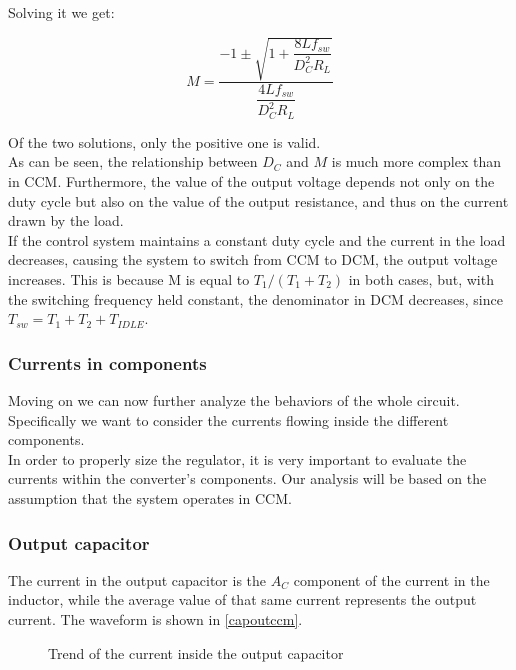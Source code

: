 \documentclass[../main.tex]{subfiles}
\begin{document}
Solving it we get:

\begin{equation}
	M = \dfrac{-1 \pm \sqrt{1 + \dfrac{8Lf_{sw}}{D^2_CR_L}} }{\dfrac{4Lf_{sw}}{D^2_CR_L}}
\end{equation}

Of the two solutions, only the positive one is valid.\\
As can be seen, the relationship between $D_C$ and $M$ is much more complex than in CCM. Furthermore, the value of the output voltage depends not only on the duty cycle but also on the value of the output resistance, and thus on the current drawn by the load. \\
If the control system maintains a constant duty cycle and the current in the load decreases, causing the system to switch from CCM to DCM, the output
voltage increases. This is because M is equal to $T_1 /(T_1 + T_2)$ in both cases, but, with the switching frequency held constant, the denominator in DCM decreases, since $T_{sw} = T_1 + T_2 + T_{IDLE}$.


\subsubsection*{Currents in components}


Moving on we can now further analyze the behaviors of the whole circuit.
Specifically we want to consider the currents flowing inside the different components.\\

In order to properly size the regulator, it is very important to evaluate the currents within the converter’s components. Our analysis will be based on the assumption that the system operates in CCM.

\subsubsection*{Output capacitor}

The current in the output capacitor is the $A_C$ component of the current in the inductor, while the average value of that same current represents the output current. The waveform is shown in \autoref{capoutccm}.

\begin{figure}
\begin{center}


\label{capoutccm}
\caption{Trend of the current inside the output capacitor}	
\end{center}	
\end{figure}
\end{document}
